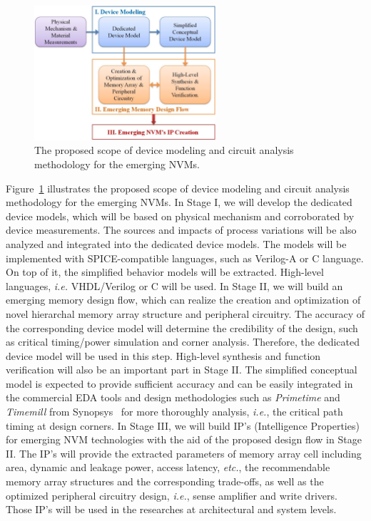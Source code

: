 \begin{figure}\centering \centering   \includegraphics[width=0.6\textwidth]{./figure/HL-flow.pdf}
\caption{The proposed scope of device modeling and circuit analysis methodology for the emerging NVMs.}\label{flow}  \vspace{-20pt}
\end{figure}
Figure~\ref{flow} illustrates the proposed scope of device modeling and circuit analysis methodology for the emerging NVMs. In Stage I, we will develop the dedicated device models, which will be based on physical mechanism and corroborated by device measurements. The sources and impacts of process variations will be also analyzed and integrated into the dedicated device models. The models will be implemented with SPICE-compatible languages, such as Verilog-A or C language. On top of it, the simplified behavior models will be extracted. High-level languages, \textit{i.e.} VHDL/Verilog or C will be used. In Stage II, we will build an emerging memory design flow, which can realize the creation and optimization of novel hierarchal memory array structure and peripheral circuitry. The accuracy of the corresponding device model will determine the credibility of the design, such as critical timing/power simulation and corner analysis. Therefore, the dedicated device model will be used in this step. High-level synthesis and function verification will also be an important part in Stage II. The simplified conceptual model is expected to provide sufficient accuracy and %
can be easily integrated in the commercial EDA tools and design methodologies such as \emph{Primetime} and \emph{Timemill} from Synopsys~\cite{synopsys} for more thoroughly analysis, \emph{i.e.}, the critical path timing at design corners. In Stage III, we will build IP's (Intelligence Properties) for emerging NVM technologies with the aid of the proposed design flow in Stage II. The IP's will provide the extracted parameters of memory array cell including area, dynamic and leakage power, access latency, \emph{etc.}, the recommendable memory array structures and the corresponding trade-offs, as well as the optimized peripheral circuitry design, \emph{i.e.}, sense amplifier and write drivers. Those IP's will be used in the researches at architectural and system levels.

